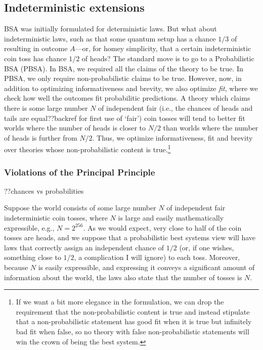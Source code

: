 \subsection{Indeterministic extensions}
BSA was initially formulated for deterministic laws. But what about indeterministic laws, such as that some quantum setup has a
chance $1/3$ of resulting in outcome $A$---or, for homey simplicity, that a certain indeterministic coin toss has chance $1/2$
of heads? The standard move is to go to a Probabilistic BSA (PBSA). In BSA, we required all the claims of the theory to be true.
In PBSA, we only require non-probabilistic claims to be true. However, now, in addition to optimizing informativeness and 
brevity, we also optimize \textit{fit}, where we check how well the outcomes fit probabilitic predictions. A theory which claims 
there is some large number $N$ of independent fair (i.e., the chances of heads and tails are equal??backref for first use of `fair') 
coin tosses will tend to better fit worlds where the number of heads is closer to $N/2$ than worlds where the number of heads is 
further from $N/2$. Thus, we optimize informativeness, fit and brevity over theories whose non-probabilistic content is true.\footnote{If we 
want a bit more elegance in the formulation, we can drop the requirement that the non-probabilistic content is true and instead
stipulate that a non-probabilistic statement has good fit when it is true but infinitely bad fit when false, so no theory with false
non-probabilistic statements will win the crown of being the best system.}

\subsubsection{Violations of the Principal Principle}\label{sec:principal-principle}
??chances vs probabilities

Suppose the world consists of some large number $N$ of independent fair indeterministic coin tosses, where $N$ is large
and easily mathematically expressible, e.g., $N=2^{256}$. As we would expect, very close to half of the coin tosses are heads, and 
we suppose that a probabilistic best systems view will have laws that correctly assign an independent chance of $1/2$ (or, if 
one wishes,  something close to $1/2$, a complication I will ignore) to each toss. Moreover, because $N$ is easily expressible,
and expressing it conveys a significant amount of information about the world, the laws also state that the number of tosses is
$N$. 

